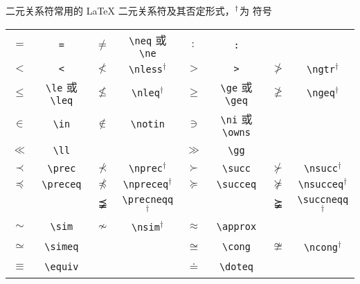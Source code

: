 \documentclass[mathserif]{beamer}
\begin{document}
\begin{frame}[fragile]{二元关系符}{常用的 \LaTeX{} 二元关系符及其否定形式，$\prescript{\dagger}{}{}$为 \AmS{} 符号}
\begin{table}[H]
\centering
\begin{tabular}{cc|cc|cc|cc}
	\toprule
	$=$ & \lstinline'=' & $\ne$ & \lstinline'\neq' 或 \lstinline'\ne' & $:$ & \lstinline':' & ~ & ~ \\
	$<$ & \lstinline'<' & $\nless$ & \lstinline'\nless'$^{\dagger}$ & $>$ & \lstinline'>' & $\ngtr$ & \lstinline'\ngtr'$^{\dagger}$ \\
	$\le$ & \lstinline'\le' 或 \lstinline'\leq' & $\nleq$ & \lstinline'\nleq'$^{\dagger}$ & $\ge$ & \lstinline'\ge' 或 \lstinline'\geq' & $\ngeq$ & \lstinline'\ngeq'$^{\dagger}$ \\
	$\in$ & \lstinline'\in' & $\notin$ & \lstinline'\notin' & $\ni$ & \lstinline'\ni' 或 \lstinline'\owns' & ~ & ~ \\
	$\ll$ & \lstinline'\ll' & ~ & ~ & $\gg$ & \lstinline'\gg' & ~ & ~ \\
	$\prec$ & \lstinline'\prec' & $\nprec$ & \lstinline'\nprec'$^{\dagger}$ & $\succ$ & \lstinline'\succ' & $\nsucc$ & \lstinline'\nsucc'$^{\dagger}$ \\
	$\preceq$ & \lstinline'\preceq' & $\npreceq$ & \lstinline'\npreceq'$^{\dagger}$ & $\succeq$ & \lstinline'\succeq' & $\nsucceq$ & \lstinline'\nsucceq'$^{\dagger}$ \\
	~ & ~ & $\precneqq$ & \lstinline'\precneqq'$^{\dagger}$ & ~ & ~ & $\succneqq$ & \lstinline'\succneqq'$^{\dagger}$ \\
	$\sim$ & \lstinline'\sim' & $\nsim$ & \lstinline'\nsim'$^{\dagger}$ & $\approx$ & \lstinline'\approx' & ~ & ~ \\
	$\simeq$ & \lstinline'\simeq' & ~ & ~ & $\cong$ & \lstinline'\cong' & $\ncong$ & \lstinline'\ncong'$^{\dagger}$ \\
	$\equiv$ & \lstinline'\equiv' & ~ & ~ & $\doteq$ & \lstinline'\doteq' & ~ & ~ \\
	\bottomrule
\end{tabular}
\end{table}
\end{frame}
\end{document}
